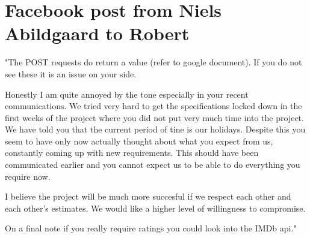 \section{Facebook post from Niels Abildgaard to Robert}
\label{app:enough}
"The POST requests do return a value (refer to google document). If you do not
see these it is an issue on your side.

Honestly I am quite annoyed by the tone especially in your recent
communications. We tried very hard to get the specifications locked down in the
first weeks of the project where you did not put very much time into the
project. We have told you that the current period of tine is our holidays.
Despite this you seem to have only now actually thought about what you expect
from us, constantly coming up with new requirements. This should have been
communicated earlier and you cannot expect us to be able to do everything you
require now.

I believe the project will be much more succesful if we respect each other and
each other's estimates. We would like a higher level of willingness to
compromise.

On a final note if you really require ratings you could look into the IMDb api."
